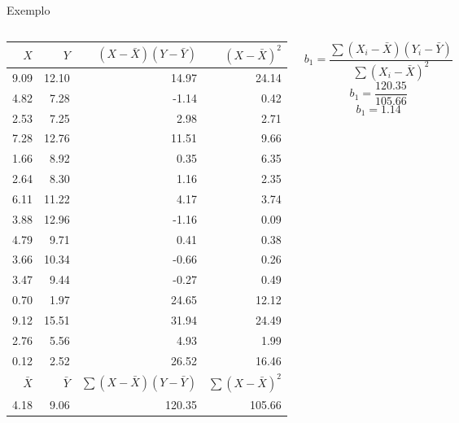 \documentclass{beamer}\usepackage[]{graphicx}\usepackage[]{color}
\begin{document}
\begin{frame}{Exemplo}

\begin{columns}[t]



\begin{tiny}
\begin{table}[ht]
\centering
\begin{tabular}{rrrr}
  \hline
  $X$ & $Y$ & $(X - \bar X)(Y - \bar Y)$ & $(X - \bar X)^2$ \\ 
  \hline
  9.09 & 12.10 & 14.97 & 24.14 \\ 
  4.82 & 7.28 & -1.14 & 0.42 \\ 
  2.53 & 7.25 & 2.98 & 2.71 \\ 
  7.28 & 12.76 & 11.51 & 9.66 \\ 
  1.66 & 8.92 & 0.35 & 6.35 \\ 
  2.64 & 8.30 & 1.16 & 2.35 \\ 
  6.11 & 11.22 & 4.17 & 3.74 \\ 
  3.88 & 12.96 & -1.16 & 0.09 \\ 
  4.79 & 9.71 & 0.41 & 0.38 \\ 
  3.66 & 10.34 & -0.66 & 0.26 \\ 
  3.47 & 9.44 & -0.27 & 0.49 \\ 
  0.70 & 1.97 & 24.65 & 12.12 \\ 
  9.12 & 15.51 & 31.94 & 24.49 \\ 
  2.76 & 5.56 & 4.93 & 1.99 \\ 
  0.12 & 2.52 & 26.52 & 16.46 \\ 
   \hline
  $\bar X$ & $\bar Y$ & $\sum(X - \bar X)(Y - \bar Y)$ & $\sum(X - \bar X)^2$\\
  \hline
  4.18 & 9.06 & 120.35 &  105.66 \\
  \hline
\end{tabular}
\end{table}
\end{tiny}


\begin{equation*}
b_1 = \frac{\sum(X_i - \bar X)(Y_i - \bar Y)}{\sum(X_i - \bar X)^2}
\end{equation*}  \pause
\vfill
\begin{equation*}
b_1 = \frac{120.35}{105.66}
\end{equation*}  \pause
\vfill
\begin{equation*}
b_1 = 1.14
\end{equation*} 
\vfill
\end{columns}  


\end{frame}
\end{document}
